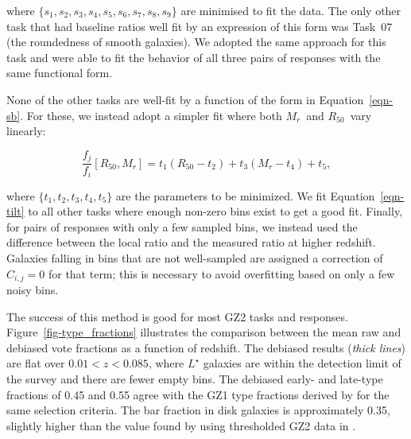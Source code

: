 \documentclass[useAMS,usenatbib]{mn2e}
\newcommand{\mr}{$M_r$}
\newcommand{\rfifty}{$R_{50}$}
\begin{document}
\noindent where $\{s_1,s_2,s_3,s_4,s_5,s_6,s_7,s_8,s_9\}$ are minimised to fit the data. The only other task that had baseline ratios well fit by an expression of this form was Task~07 (the roundedness of smooth galaxies). We adopted the same approach for this task and were able to fit the behavior of all three pairs of responses with the same functional form. 

None of the other tasks are well-fit by a function of the form in Equation~\ref{eqn-sb}. For these, we instead adopt a simpler fit where both \mr~and \rfifty~vary linearly:

\begin{equation}
\frac{f_j}{f_i}[R_{50},M_r] = t_1(R_{50} - t_2) + t_3(M_r - t_4) + t_5,
\label{eqn-tilt}
\end{equation}

\noindent where $\{t_1,t_2,t_3,t_4,t_5\}$ are the parameters to be minimized. We fit Equation~\ref{eqn-tilt} to all other tasks where enough non-zero bins exist to get a good fit. Finally, for pairs of responses with only a few sampled bins, we instead used the difference between the local ratio and the measured ratio at higher redshift. Galaxies falling in bins that are not well-sampled are assigned a correction of $C_{i,j}=0$ for that term; this is necessary to avoid overfitting based on only a few noisy bins. 



The success of this method is good for most GZ2 tasks and responses. Figure~\ref{fig-type_fractions} illustrates the comparison between the mean raw and debiased vote fractions as a function of redshift. The debiased results ({\it thick lines}) are flat over $0.01<z<0.085$, where $L^\star$ galaxies \citep[$M_r\sim-20.44$;][]{bla03a} are within the detection limit of the survey and there are fewer empty bins. The debiased early- and late-type fractions of 0.45 and 0.55 agree with the GZ1 type fractions derived by \citet{bam09} for the same selection criteria. The bar fraction in disk galaxies is approximately 0.35, slightly higher than the value found by using thresholded GZ2 data in \citet{mas11c}.
\end{document}
